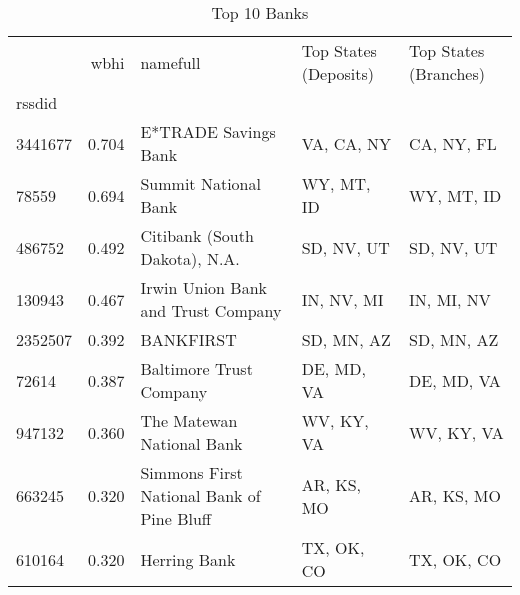 \begin{table}
\centering
\caption{Top 10 Banks}
\label{tab:top10}
\begin{tabular}{lrlll}
\toprule
{} &  wbhi &                                   namefull & Top States (Deposits) & Top States (Branches) \\
rssdid  &       &                                            &                       &                       \\
\midrule
3441677 & 0.704 &                       E*TRADE Savings Bank &            VA, CA, NY &            CA, NY, FL \\
78559   & 0.694 &                       Summit National Bank &            WY, MT, ID &            WY, MT, ID \\
486752  & 0.492 &              Citibank (South Dakota), N.A. &            SD, NV, UT &            SD, NV, UT \\
130943  & 0.467 &         Irwin Union Bank and Trust Company &            IN, NV, MI &            IN, MI, NV \\
2352507 & 0.392 &                                  BANKFIRST &            SD, MN, AZ &            SD, MN, AZ \\
72614   & 0.387 &                    Baltimore Trust Company &            DE, MD, VA &            DE, MD, VA \\
947132  & 0.360 &                  The Matewan National Bank &            WV, KY, VA &            WV, KY, VA \\
663245  & 0.320 &  Simmons First National Bank of Pine Bluff &            AR, KS, MO &            AR, KS, MO \\
610164  & 0.320 &                               Herring Bank &            TX, OK, CO &            TX, OK, CO \\
\bottomrule
\end{tabular}
\end{table}
